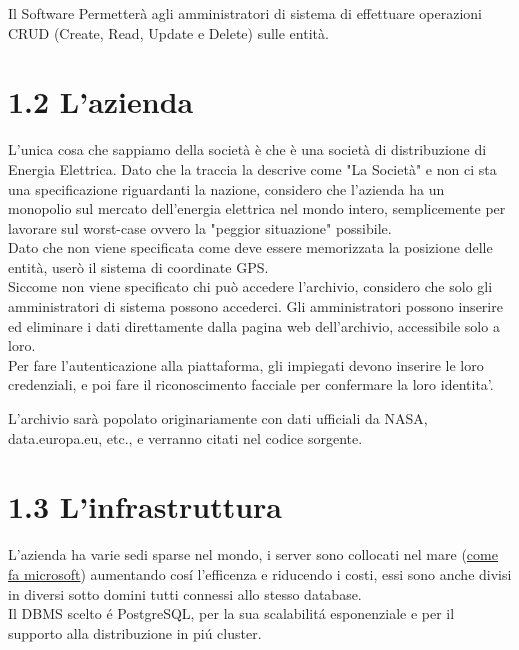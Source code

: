 Il Software Permetterà agli amministratori di sistema di effettuare operazioni CRUD (Create, Read, Update e Delete) sulle entità.

\section*{1.2 \hspace{1cm} L'azienda}
L'unica cosa che sappiamo della società è che è una società di distribuzione di Energia Elettrica. Dato che la traccia la descrive come "La Società" e non ci sta una specificazione riguardanti la nazione, considero che l'azienda ha un monopolio sul mercato dell'energia elettrica nel mondo intero, semplicemente per lavorare sul worst-case ovvero la "peggior situazione" possibile. \\

Dato che non viene specificata come deve essere memorizzata la posizione delle entità, userò il sistema di coordinate GPS. \\

Siccome non viene specificato chi può accedere l'archivio, considero che solo gli amministratori di sistema possono accederci. Gli amministratori possono inserire ed eliminare i dati direttamente dalla pagina web dell'archivio, accessibile solo a loro. \\

Per fare l'autenticazione alla piattaforma, gli impiegati devono inserire le loro credenziali, e poi fare il riconoscimento facciale per confermare la loro identita'.

L'archivio sarà popolato originariamente con dati ufficiali da NASA, data.europa.eu, etc., e verranno citati nel codice sorgente. \\




\section*{1.3 \hspace{1cm} L'infrastruttura}
L'azienda ha varie sedi sparse nel mondo, i server sono collocati nel mare (\href{https://datacenterfrontier.com/microsoft-servers-in-our-underwater-data-center-are-super-reliable/#:~:text=Microsoft%3A%20Servers%20in%20Our%20Underwater%20Data%20Center%20Are%20Super%2DReliable,-By%20Rich%20Miller&text=Microsoft%20recently%20retrieved%20the%20Project,the%20Orkney%20Islands%20in%20Scotland}{come fa microsoft}) aumentando cosí l'efficenza e riducendo i costi, essi sono anche divisi in diversi sotto domini tutti connessi allo stesso database. \\
Il DBMS scelto é PostgreSQL, per la sua scalabilitá esponenziale e per il supporto alla distribuzione in piú cluster. \\

